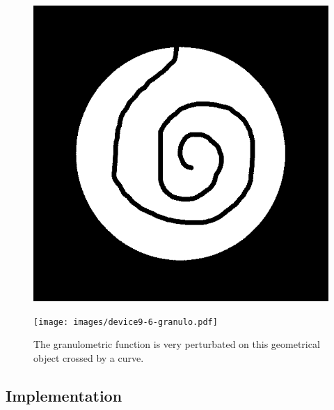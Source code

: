 \begin{figure}[!ht]
	\begin{center}
    	\begin{minipage}[c]{.46\linewidth}
    		\includegraphics[scale=0.28]{images/device9-6-object.png}
    	\end{minipage} \hfill
    	\begin{minipage}[c]{.46\linewidth}
    		\texttt{[image: images/device9-6-granulo.pdf]}
    	\end{minipage}
	\end{center}
	\label{device9-6}
	\caption{The granulometric function is very perturbated on this geometrical object crossed by a curve.}
\end{figure}

\subsection{Implementation}


